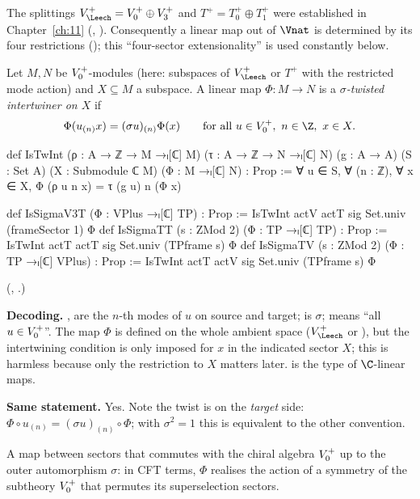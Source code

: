 The splittings $V_\Leech^+=\chXIVA\oplus\chXIVB$ and $T^+=T_0^+\oplus T_1^+$ were established in
Chapter~\ref{ch:11} (, ).  Consequently a linear map
out of $\Vnat$ is determined by its four restrictions (); this ``four-sector
extensionality'' is used constantly below.

\begin{definition}\label{ch14:def:twint}
Let $M,N$ be $V_0^{+}$-modules (here: subspaces of $V_\Leech^+$ or $T^+$ with the restricted mode
action) and $X\subseteq M$ a subspace.  A linear map $\Phi:M\to N$ is a \emph{$\sigma$-twisted
intertwiner on $X$} if
\begin{equation*}
  \Phi(u_{(n)}x)=(\sigma u)_{(n)}\Phi(x)\qquad\text{for all }u\in\chXIVA,\ n\in\Z,\ x\in X.
\end{equation*}
\end{definition}
\begin{leancode}
def IsTwInt (ρ : A → ℤ → M →ₗ[ℂ] M) (τ : A → ℤ → N →ₗ[ℂ] N) (g : A → A) (S : Set A)
    (X : Submodule ℂ M) (Φ : M →ₗ[ℂ] N) : Prop :=
  ∀ u ∈ S, ∀ (n : ℤ), ∀ x ∈ X, Φ (ρ u n x) = τ (g u) n (Φ x)

def IsSigmaV3T (Φ : VPlus →ₗ[ℂ] TP) : Prop :=
  IsTwInt actV actT sig Set.univ (frameSector 1) Φ
def IsSigmaTT (s : ZMod 2) (Φ : TP →ₗ[ℂ] TP) : Prop :=
  IsTwInt actT actT sig Set.univ (TPframe s) Φ
def IsSigmaTV (s : ZMod 2) (Φ : TP →ₗ[ℂ] VPlus) : Prop :=
  IsTwInt actT actV sig Set.univ (TPframe s) Φ
\end{leancode}
(, .)

\begin{dictionary}
\textbf{Decoding.}  ,  are the $n$-th modes of $u$ on source and target;
 is $\sigma$;  means ``all $u\in V_0^{+}$''.  The map $\Phi$ is defined
on the whole ambient space ($V_\Leech^+$ or ), but the intertwining condition is only
imposed for $x$ in the indicated sector $X$; this is harmless because only the restriction to $X$
matters later.   is the type of $\C$-linear maps.

\textbf{Same statement.}  Yes.  Note the twist is on the \emph{target} side:
$\Phi\circ u_{(n)}=(\sigma u)_{(n)}\circ\Phi$; with $\sigma^2=1$ this is equivalent to the other
convention.
\end{dictionary}
\begin{physics}
A map between sectors that commutes with the chiral algebra $V_0^{+}$ up to the outer automorphism $\sigma$: in CFT terms, $\Phi$ realises the action of a symmetry of the subtheory $V_0^{+}$ that permutes its superselection sectors.
\end{physics}


